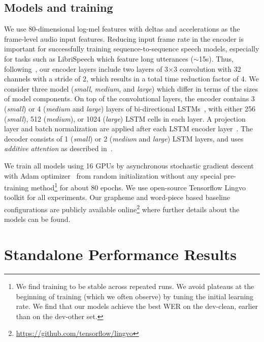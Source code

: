 \subsection{Models and training}
\vspace{-1mm}
\label{sec:model_tr}
We use 80-dimensional log-mel features with deltas and accelerations as the
frame-level audio input features.
Reducing input frame rate in the encoder is important for successfully training
sequence-to-sequence speech models, especially for tasks such as LibriSpeech
which feature long utterances ($\sim$15s).
Thus, following~\cite{zhangCJ17}, our encoder layers include two layers of 3$\times$3 convolution
with 32 channels with a stride of 2, which results in a total time reduction factor of 4.
We consider three model (\textit{small}, \textit{medium}, and \textit{large})
which differ in terms of the sizes of model components.
On top of the convolutional layers, the encoder contains 3 (\textit{small}) or 4
(\textit{medium} and \textit{large}) layers of bi-directional
LSTMs~\cite{schuster1997bidirectional}, with either 256 (\textit{small}), 512
(\textit{medium}), or 1024 (\textit{large}) LSTM \cite{hochreiter1997long} cells
in each layer.
A projection layer and batch normalization are applied after each LSTM encoder
layer~\cite{zhangCJ17}.
The decoder consists of 1 (\textit{small}) or 2 (\textit{medium} and
\textit{large}) LSTM layers, and uses \emph{additive attention} as described in~\cite{WeissCJWC17}.

We train all models using 16 GPUs by asynchronous stochastic gradient descent
with Adam optimizer~\cite{kingma15} from random initialization without any
special pre-training method\footnote{We find training to be stable across repeated runs.
We avoid plateaus at the beginning of training (which we often observe) by tuning the initial learning rate.
We find that our models achieve the best WER on the dev-clean, earlier than on the dev-other set.} for about 80 epochs.
We use open-source Tensorflow Lingvo toolkit \cite{shen2019lingvo} for all experiments. Our
grapheme and word-piece based baseline configurations are publicly available online\footnote{\url{https://github.com/tensorflow/lingvo}}
where further details about the models can be found.

\vspace{-2mm}
\section{Standalone Performance Results}
\label{sec:part1}
